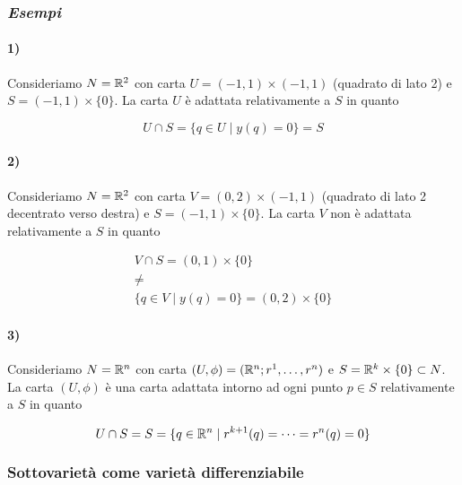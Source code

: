 \subsubsection{\textit{Esempi}}

\paragraph{1)}

Consideriamo $ N = \mathbb{R}^{2} $ con carta $ U = (-1,1) \times (-1,1) $ (quadrato di lato 2) e $ S = (-1,1) \times \{0\} $. La carta $ U $ è adattata relativamente a $ S $ in quanto

\begin{equation}
	U \cap S = \{ q \in U \mid y(q) = 0 \} = S
\end{equation}

\paragraph{2)}

Consideriamo $ N = \mathbb{R}^{2} $ con carta $ V = (0,2) \times (-1,1) $ (quadrato di lato 2 decentrato verso destra) e $ S = (-1,1) \times \{0\} $. La carta $ V $ non è adattata relativamente a $ S $ in quanto

\begin{gather}
	V \cap S = (0,1) \times \{0\}\nonumber\\
	\neq\\
	\{ q \in V \mid y(q) = 0 \} = (0,2) \times \{0\}\nonumber
\end{gather}

\paragraph{3)}

Consideriamo $ N = \mathbb{R}^{n} $ con carta $ (U,\phi) = (\mathbb{R}^{n}; r^{1},\dots,r^{n}) $ e $ S = \mathbb{R}^{k} \times \{0\} \subset N $. La carta $ (U,\phi) $ è una carta adattata intorno ad ogni punto $ p \in S $ relativamente a $ S $ in quanto

\begin{equation}
	U \cap S = S = \{ q \in \mathbb{R}^{n} \mid r^{k+1}(q) = \dots = r^{n}(q) = 0 \}
\end{equation}

\subsubsection{Sottovarietà come varietà differenziabile}


